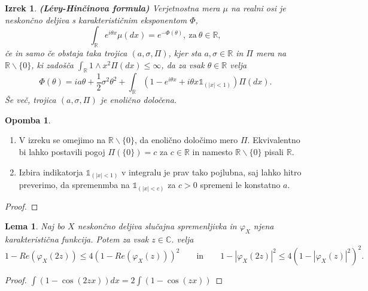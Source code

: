 \documentclass[12pt,a4paper]{amsart}
\theoremstyle{definition} %
\newtheorem{opomba}[definicija]{Opomba}
\theoremstyle{plain} %
\newtheorem{lema}[definicija]{Lema}
\newtheorem{izrek}[definicija]{Izrek}
\begin{document}
    \begin{izrek}
        \textbf{(Lévy-Hinčinova formula)} Verjetnostna mera $\mu$ na realni osi je neskončno deljiva s 
        karakterističnim eksponentom $\Phi$,
        $$
        \int_{\mathbb{R}} e^{i\theta x} \mu(dx) = e^{-\Phi(\theta)},\ \text{za} \ \theta \in \mathbb{R},
        $$
        če in samo če obstaja taka trojica $(a, \sigma, \Pi)$, kjer sta $a, \sigma \in \mathbb{R}$ in $\Pi$
        mera na $\mathbb{R}\backslash\{0\}$, ki zadošča $\int_{\mathbb{R}}1 \wedge x^2 \Pi(dx)\leq \infty$, 
        da za vsak $\theta \in \mathbb{R}$ velja
        $$
        \Phi(\theta) = ia\theta + \frac{1}{2}\sigma^2\theta^2 + \int_{\mathbb{R}}(1 - e^{i\theta x} + i\theta x \mathds{1}_{(|x|<1)})\Pi(dx).
        $$
        Še več, trojica $(a, \sigma, \Pi)$ je enolično določena.
    \end{izrek}

    \begin{opomba}
        \begin{enumerate}
            \item V izreku se omejimo na $\mathbb{R}\backslash\{0\}$, da enolično določimo mero $\Pi$. Ekvivalentno bi 
            lahko postavili pogoj $\Pi(\{0\}) = c$ za $c\in \mathbb{R}$ in namesto $\mathbb{R}\backslash\{0\}$ pisali $\mathbb{R}$.
            \item Izbira indikatorja $\mathds{1}_{(|x|<1)}$ v integralu je prav tako pojlubna, saj lahko hitro preverimo, da spremenmba 
            na  $\mathds{1}_{(|x|<c)}$ za $c>0$ spremeni le konstatno $a$.
        \end{enumerate}
    \end{opomba}

    \begin{proof}

    \end{proof}

    \begin{lema}
        Naj bo $X$ neskončno deljiva slučajna spremenljivka in $\varphi_X$ njena karakteristična funkcija. Potem za vsak $z \in \mathbb{C}$.
        velja
        $$
            1 - Re(\varphi_X(2z)) \leq 4(1 - Re(\varphi_X(z)))^2 \qquad \text{in} \qquad 1 - \left|\varphi_X(2z)\right|^2 \leq 4(1 - \left|\varphi_X(z)\right|^2)^2.
        $$
    \end{lema}

    \begin{proof}
        $\int (1 - \cos(2zx))dx = 2 \int (1 - \cos(zx))$
    \end{proof}
\end{document}
